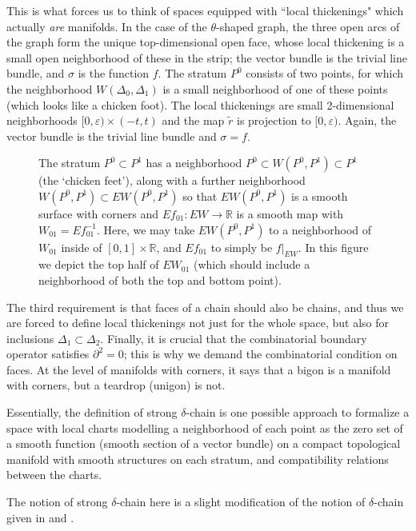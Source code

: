 \documentclass{memo-l}
\theoremstyle{definition}
\theoremstyle{remark}
\numberwithin{section}{chapter}
\numberwithin{equation}{chapter}
\begin{document}
This is what forces us to think of spaces equipped with ``local thickenings" which actually \emph{are} manifolds. In the case of the $\theta$-shaped graph, the three open arcs of the graph form the unique top-dimensional open face, whose local thickening is a small open neighborhood of these in the strip; the vector bundle is the trivial line bundle, and $\sigma$ is the function $f$. The stratum $P^0$ consists of two points, for which the neighborhood $W(\Delta_0, \Delta_1)$ is a small neighborhood of one of these points (which looks like a chicken foot). The local thickenings are small 2-dimensional neighborhoods $[0,\varepsilon) \times (-t,t)$ and the map $\tilde r$ is projection to $[0,\varepsilon)$. Again, the vector bundle is the trivial line bundle and $\sigma = f$.

\begin{figure}[h]
    \centering
    
    \caption{The stratum $P^0 \subset P^1$ has a neighborhood $P^0 \subset W(P^0, P^1) \subset P^1$ (the `chicken feet'), along with a further neighborhood $W(P^0, P^1) \subset EW(P^0, P^1)$ so that $EW(P^0, P^1)$ is a smooth surface with corners and $Ef_{01}: EW \to \mathbb R$ is a smooth map with $W_{01} = Ef_{01}^{-1}$. Here, we may take $EW(P^0, P^1)$ to a neighborhood of $W_{01}$ inside of $[0,1] \times \mathbb R$, and $Ef_{01}$ to simply be $f|_{EW}$. In this figure we depict the top half of $EW_{01}$ (which should include a neighborhood of both the top and bottom point).}
    \label{fig:2}
\end{figure}

The third requirement is that faces of a chain should also be chains, and thus we are forced to define local thickenings not just for the whole space, but also for inclusions $\Delta_1 \subset \Delta_2$. 
Finally, it is crucial that the combinatorial boundary operator satisfies $\partial^2 = 0$; this is why we demand the combinatorial condition on faces. At the level of manifolds with corners, it says that a bigon is a manifold with corners, but a teardrop (unigon) is not.

Essentially, the definition of strong $\delta$-chain is one possible approach to formalize a space with local charts modelling a neighborhood of each point as the zero set of a smooth function (smooth section of a vector bundle) on a compact topological manifold with smooth structures on each stratum, and compatibility relations between the charts.

The notion of strong $\delta$-chain here is a slight modification of the notion of $\delta$-chain given in \cite[Definition~24.7.1]{KMSW} and \cite[Definition~4.1.1]{Lin}. 
\end{document}
